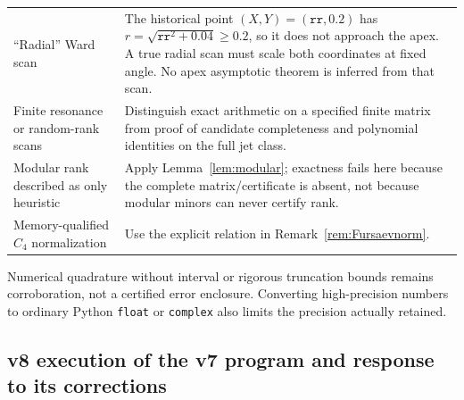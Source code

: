 \documentclass[11pt,a4paper]{article}
\newcommand{\loc}[1]{\nolinkurl{#1}}
\theoremstyle{plain}
\theoremstyle{definition}
\theoremstyle{remark}
\numberwithin{equation}{section}
\begin{document}
\begin{longtable}{@{}L{.31\linewidth}L{.62\linewidth}@{}}
``Radial'' Ward scan &
The historical point \((X,Y)=(\texttt{rr},0.2)\) has
\(r=\sqrt{\texttt{rr}^2+0.04}\ge0.2\), so it does not approach
the apex. A true radial scan must scale both coordinates at
fixed angle. No apex asymptotic theorem is inferred from that
scan.\\

Finite resonance or random-rank scans &
Distinguish exact arithmetic on a specified finite matrix from
proof of candidate completeness and polynomial identities on
the full jet class.\\

Modular rank described as only heuristic &
Apply Lemma~\ref{lem:modular}; exactness fails here because the
complete matrix/certificate is absent, not because modular
minors can never certify rank.\\

Memory-qualified \(C_4\) normalization &
Use the explicit relation in
Remark~\ref{rem:Fursaevnorm}.\\
\end{longtable}
\endgroup

Numerical quadrature without interval or rigorous truncation
bounds remains corroboration, not a certified error enclosure.
Converting high-precision numbers to ordinary Python
\loc{float} or \loc{complex} also limits the precision actually
retained.


\subsection{v8 execution of the v7 program and response to its corrections}
\label{sec:v8response}
\end{document}
